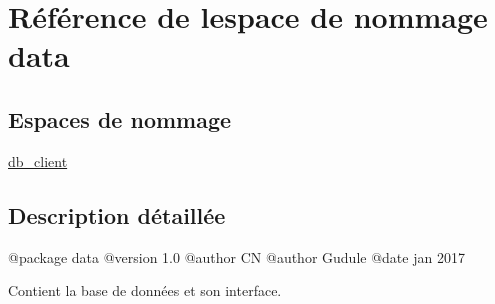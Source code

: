 \hypertarget{namespacedata}{}\section{Référence de l\textquotesingle{}espace de nommage data}
\label{namespacedata}
\subsection*{Espaces de nommage}
\begin{DoxyCompactItemize}
\item 
 \hyperlink{namespacedata_1_1db__client}{db\+\_\+client}
\end{DoxyCompactItemize}


\subsection{Description détaillée}
\begin{DoxyVerb}@package data
@version 1.0
@author CN
@author Gudule
@date jan 2017

Contient la base de données et son interface.\end{DoxyVerb}
 